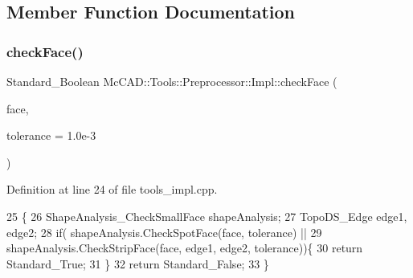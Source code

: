 \subsection{Member Function Documentation}
\mbox{\label{classMcCAD_1_1Tools_1_1Preprocessor_1_1Impl_a3bbfdb37f50683f6a216a608ba231e84}} 
\subsubsection{\texorpdfstring{check\+Face()}{checkFace()}\hspace{0.1cm}{\footnotesize\ttfamily [1/2]}}
{\footnotesize\ttfamily Standard\+\_\+\+Boolean Mc\+C\+A\+D\+::\+Tools\+::\+Preprocessor\+::\+Impl\+::check\+Face (\begin{DoxyParamCaption}\item[{const Topo\+D\+S\+\_\+\+Face \&}]{face,  }\item[{Standard\+\_\+\+Real}]{tolerance = {\ttfamily 1.0e-\/3} }\end{DoxyParamCaption})}



Definition at line 24 of file tools\+\_\+impl.\+cpp.


\begin{DoxyCode}
25                                                                     \{
26     ShapeAnalysis\_CheckSmallFace shapeAnalysis;
27     TopoDS\_Edge edge1, edge2;
28     \textcolor{keywordflow}{if}( shapeAnalysis.CheckSpotFace(face, tolerance) ||
29             shapeAnalysis.CheckStripFace(face, edge1, edge2, tolerance))\{
30         \textcolor{keywordflow}{return} Standard\_True;
31     \}
32     \textcolor{keywordflow}{return} Standard\_False;
33 \}
\end{DoxyCode}
\mbox{\label{classMcCAD_1_1Tools_1_1Preprocessor_1_1Impl_a3bbfdb37f50683f6a216a608ba231e84}} 
